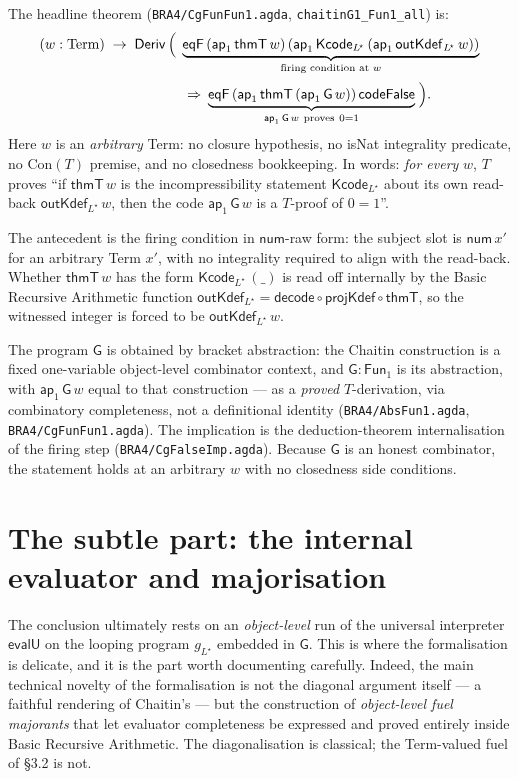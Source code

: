 \documentclass[11pt]{article}
\newcommand{\Term}{\mathrm{Term}}
\newcommand{\Deriv}{\mathsf{Deriv}}
\newcommand{\thmT}{\mathsf{thmT}}
\newcommand{\evalU}{\mathsf{evalU}}
\newcommand{\Kcode}{\mathsf{Kcode}}
\newcommand{\outK}{\mathsf{outKdef}}
\newcommand{\codeFalse}{\mathsf{codeFalse}}
\newcommand{\num}{\mathsf{num}}
\newcommand{\ap}[1]{\mathsf{ap}_{#1}}
\newcommand{\Fun}[1]{\mathsf{Fun}_{#1}}
\newcommand{\imp}{\mathbin{\Rightarrow}}
\newcommand{\eqF}{\mathsf{eqF}}
\newcommand{\GG}{\mathsf{G}}
\newcommand{\Lstar}{L^{\!\star}}
\begin{document}
The headline theorem
(\texttt{BRA4/CgFunFun1.agda}, \texttt{chaitinG1\_Fun1\_all}) is:
\[
  \begin{aligned}
  (w : \Term) \;\to\; \Deriv\,\Bigl(\;
    & \underbrace{\eqF\,(\ap{1}\,\thmT\,w)\,
          (\ap{1}\,\Kcode_{\Lstar}\,(\ap{1}\,\outK_{\Lstar}\,w))}_{\text{firing condition at }w} \\[2pt]
    & {}\;\imp\;
      \underbrace{\eqF\,(\ap{1}\,\thmT\,(\ap{1}\,\GG\,w))\,\codeFalse}_{\ap{1}\,\GG\,w\ \text{proves}\ 0=1}
    \;\Bigr).
  \end{aligned}
\]
Here $w$ is an \emph{arbitrary} Term: no closure hypothesis, no
\textsf{isNat} integrality predicate, no $\mathrm{Con}(T)$ premise, and
no closedness bookkeeping. In words: \emph{for every} $w$, $T$ proves
``if $\thmT\,w$ is the incompressibility statement $\Kcode_{\Lstar}$
about its own read-back $\outK_{\Lstar}\,w$, then the code
$\ap{1}\,\GG\,w$ is a $T$-proof of $0=1$''.

The antecedent is the firing condition in $\num$-raw form: the subject
slot is $\num\,x'$ for an arbitrary Term $x'$, with no integrality
required to align with the read-back. Whether $\thmT\,w$ has the form
$\Kcode_{\Lstar}\,(\_)$ is read off internally by the Basic Recursive Arithmetic function
$\outK_{\Lstar} = \mathsf{decode}\circ\mathsf{projKdef}\circ\thmT$, so
the witnessed integer is forced to be $\outK_{\Lstar}\,w$.

The program $\GG$ is obtained by bracket abstraction: the Chaitin
construction is a fixed one-variable object-level combinator context,
and $\GG : \Fun{1}$ is its abstraction, with $\ap{1}\,\GG\,w$ equal to
that construction --- as a \emph{proved} $T$-derivation, via combinatory
completeness, not a definitional identity
(\texttt{BRA4/AbsFun1.agda}, \texttt{BRA4/CgFunFun1.agda}). The
implication is the deduction-theorem internalisation of the firing step
(\texttt{BRA4/CgFalseImp.agda}). Because $\GG$ is an honest combinator,
the statement holds at an arbitrary $w$ with no closedness side
conditions.

\section{The subtle part: the internal evaluator and majorisation}

The conclusion ultimately rests on an \emph{object-level} run of the
universal interpreter $\evalU$ on the looping program $g_{\Lstar}$
embedded in $\GG$. This is where the formalisation is delicate, and it
is the part worth documenting carefully. Indeed, the main technical
novelty of the formalisation is not the diagonal argument itself --- a
faithful rendering of Chaitin's --- but the construction of
\emph{object-level fuel majorants} that let evaluator completeness be
expressed and proved entirely inside Basic Recursive Arithmetic. The diagonalisation is
classical; the Term-valued fuel of \S3.2 is not.
\end{document}
